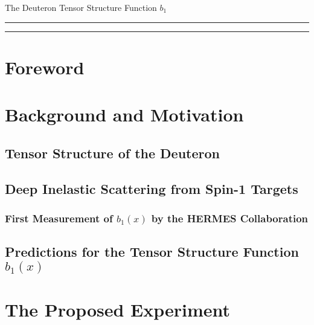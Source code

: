 \documentclass[12pt]{article}
\begin{document}
\pagestyle{empty}
 
\begin{center}
 \LARGE{
  The Deuteron Tensor Structure Function $b_1$
 }
\end{center}
%
\hrule \vspace{.05cm}\hrule
%


\newpage

\begin{abstract}
  
\end{abstract}

\newpage

\section*{Foreword}




\clearpage


\tableofcontents


\pagestyle{plain}

\clearpage

\section{Background and Motivation}

\subsection{Tensor Structure of the Deuteron}
 
\subsection{Deep Inelastic Scattering from Spin-1 Targets}
 

\subsubsection{First Measurement of $b_1(x)$ by the HERMES Collaboration}
 

\subsection{Predictions for the Tensor Structure Function $b_1(x)$}
\label{PREDB1X}
   


\section{The Proposed Experiment}

%

\end{document}
